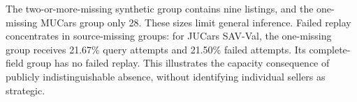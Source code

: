 The two-or-more-missing synthetic group contains nine listings, and the
one-missing MUCars group only 28. These sizes limit general inference.
Failed replay concentrates in source-missing groups: for JUCars SAV-Val,
the one-missing group receives 21.67\% query attempts and 21.50\%
failed attempts. Its complete-field group has no failed replay.
This illustrates the capacity consequence of publicly indistinguishable
absence, without identifying individual sellers as strategic.
